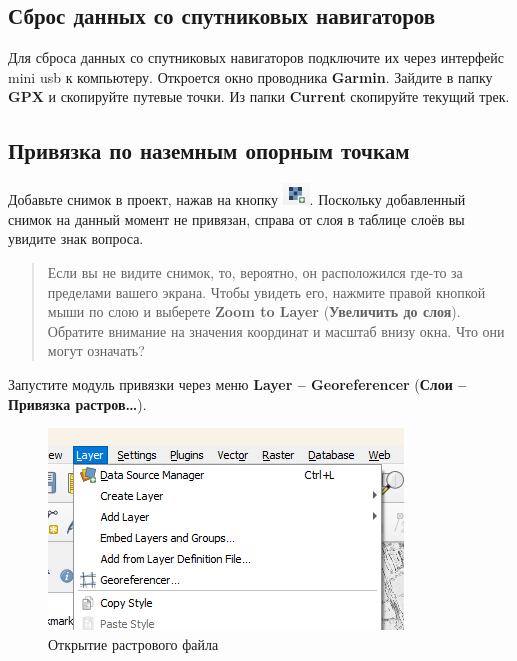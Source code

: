 \documentclass[
  12pt,
]{book}
\begin{document}
\subsection{Сброс данных со спутниковых навигаторов}\label{practice-georeference-gpx}

Для сброса данных со спутниковых навигаторов подключите их через интерфейс mini usb к компьютеру. Откроется окно проводника \textbf{Garmin}. Зайдите в папку \textbf{GPX} и скопируйте путевые точки. Из папки \textbf{Current} скопируйте текущий трек.

\subsection{Привязка по наземным опорным точкам}\label{practice-georeference-gcp}

Добавьте снимок в проект, нажав на кнопку \includegraphics{images/Practice/Open_raster.png}. Поскольку добавленный снимок на данный момент не привязан, справа от слоя в таблице слоёв вы увидите знак вопроса.

\begin{quote}
Если вы не видите снимок, то, вероятно, он расположился где-то за пределами вашего экрана. Чтобы увидеть его, нажмите правой кнопкой мыши по слою и выберете \textbf{Zoom to Layer} (\textbf{Увеличить до слоя}). Обратите внимание на значения координат и масштаб внизу окна. Что они могут означать?
\end{quote}

Запустите модуль привязки через меню \textbf{Layer -- Georeferencer} (\textbf{Слои -- Привязка растров\ldots{}}).

\begin{figure}
\centering
\includegraphics{images/Practice/Georeference_raster.png}
\caption{Открытие растрового файла}
\end{figure}
\end{document}
